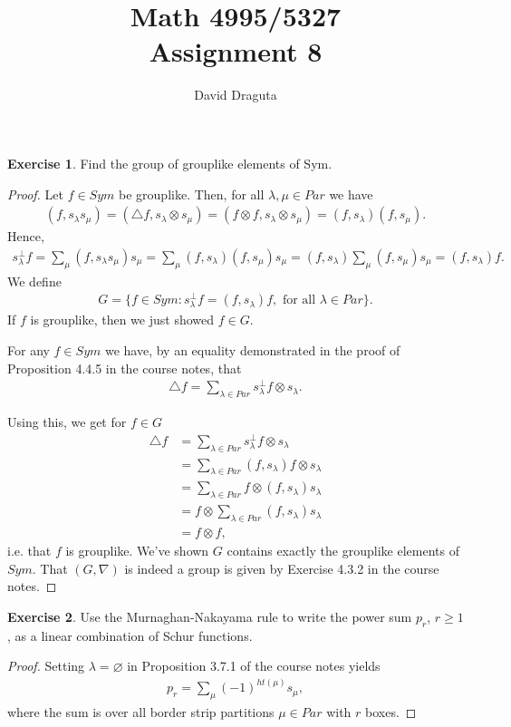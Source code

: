 \documentclass[12pt]{extarticle}
\title{ Math 4995/5327
  \\
  Assignment 8}
\author{David Draguta}
\newcommand{\set}[1]{\{#1\}}
\newcommand{\<}{\langle}
\renewcommand{\>}{\rangle}
\renewcommand{\emptyset}{\varnothing}
\theoremstyle{definition}
\newtheorem{exercise}{Exercise}
\begin{document}
\maketitle

\begin{exercise}
  Find the group of grouplike elements of Sym.
\end{exercise}
\begin{proof}
  Let $f \in Sym$ be grouplike. Then, for all $\lambda, \mu \in Par$ we have
  \begin{align*}
    (f, s_{\lambda} s_{\mu}) = (\triangle f, s_{\lambda} \otimes s_{\mu}) = (f \otimes f, s_{\lambda} \otimes s_{\mu}) = (f, s_{\lambda})(f, s_\mu).
  \end{align*}
  Hence,
  \begin{align*}
    s_{\lambda}^{\perp} f = \sum\limits_{\mu} (f, s_\lambda s_\mu) s_{\mu} =  \sum\limits_{\mu} (f, s_{\lambda})(f, s_\mu)s_{\mu} =  (f, s_{\lambda})\sum\limits_{\mu}(f, s_\mu)s_{\mu} = (f,s_\lambda)f.
  \end{align*}
  We define
  \begin{align*}
    G = \set{f \in Sym: s_\lambda^{\perp} f = (f,s_\lambda)f, \text{ for all } \lambda \in Par}.
  \end{align*}
  If $f$ is grouplike, then we just showed $f \in G$.

  For any $f \in Sym$ we have, by an equality demonstrated in the proof of Proposition 4.4.5 in the course notes, that
  \begin{align*}
    \triangle f = \sum\limits_{\lambda \in Par} s_\lambda^{\perp}f \otimes s_{\lambda}.
  \end{align*}

  Using this, we get for $f \in G$
  \begin{align*}
    \triangle f
    &= 
    \sum\limits_{\lambda \in Par} s_\lambda^{\perp}f \otimes s_{\lambda} \\
    &=  \sum\limits_{\lambda \in Par} (f,s_\lambda)f \otimes s_{\lambda} \\
    &=  \sum\limits_{\lambda \in Par} f \otimes (f,s_\lambda)s_{\lambda} \\
    &= f \otimes \sum\limits_{\lambda \in Par}(f,s_\lambda)s_{\lambda} \\
    &=
    f \otimes f,
  \end{align*}
  i.e. that $f$ is grouplike. We've shown $G$ contains exactly the grouplike elements of $Sym$. That $(G, \nabla)$ is indeed a group is given by Exercise 4.3.2 in the course notes.
\end{proof}
\begin{exercise}
  Use the Murnaghan-Nakayama rule to write the power sum $p_r$, $r \geq 1$, as a linear combination of Schur functions.
\end{exercise}
\begin{proof}
  Setting $\lambda= \emptyset$ in Proposition 3.7.1 of the course notes yields
  \begin{align*}
    p_r  = \sum\limits_{\mu}(-1)^{ht(\mu)} s_\mu,
  \end{align*}
  where the sum is over all border strip partitions $\mu \in Par$ with $r$ boxes.
\end{proof}
\end{document}
